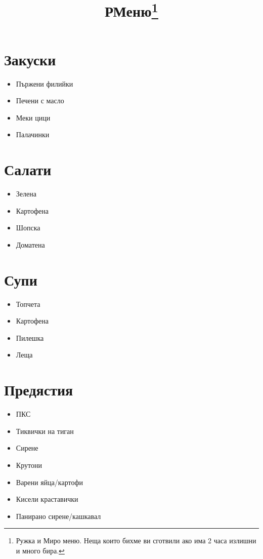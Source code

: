 \documentclass{article}
\title{РМеню\footnote{Ружка и Миро меню. Неща които бихме ви сготвили ако има 2 часа излишни и много бира.}}
\begin{document}
\maketitle
\begin{multicols}{2}
\section{Закуски}
\begin{itemize}
    \item{Пържени филийки}
    \item{Печени с масло}
    \item{Меки цици}
    \item{Палачинки}
\end{itemize}

\section{Салати}
\begin{itemize}
    \item{Зелена}
    \item{Картофена}
    \item{Шопска}
    \item{Доматена}
\end{itemize}

\section{Супи}
\begin{itemize}
    \item{Топчета}
    \item{Картофена}
    \item{Пилешка}
    \item{Леща}
\end{itemize}

\section{Предястия}
\begin{itemize}
    \item{ПКС}
    \item{Тиквички на тиган}
    \item{Сирене}
    \item{Крутони}
    \item{Варени яйца/картофи}
    \item{Кисели краставички}
    \item{Панирано сирене/кашкавал}
\end{itemize}


\end{multicols}
\end{document}
